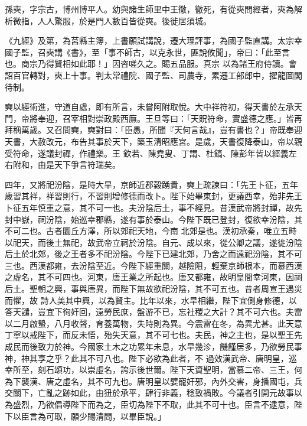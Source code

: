 \begin{pinyinscope}
 孫奭，字宗古，博州博平人。幼與諸生師里中王徹，徹死，有從奭問經者，奭為解析微指，人人驚服，於是門人數百皆從奭。後徙居須城。



 《九經》及第，為莒縣主簿，上書願試講說，遷大理評事，為國子監直講。太宗幸國子監，召奭講《書》，至「事不師古，以克永世，匪說攸聞」，帝曰：「此至言也。商宗乃得賢相如此耶！」因咨嗟久之。賜五品服。真宗
 以為諸王府侍讀。會詔百官轉對，奭上十事。判太常禮院、國子監、司農寺，累遷工部郎中，擢龍圖閣待制。



 奭以經術進，守道自處，即有所言，未嘗阿附取悅。大中祥符初，得天書於左承天門，帝將奉迎，召宰相對崇政殿西廡。王旦等曰：「天貺符命，實盛德之應。」皆再拜稱萬歲。又召問奭，奭對曰：「臣愚，所聞『天何言哉』，豈有書也？」帝既奉迎天書，大赦改元，布告其事於天下，築玉清昭應宮。是歲，天書復降泰山，帝以親受符命，遂議封禪，作禮樂。王
 欽若、陳堯叟、丁謂、杜鎬、陳彭年皆以經義左右附和，由是天下爭言符瑞矣。



 四年，又將祀汾陰，是時大旱，京師近郡穀踴貴，奭上疏諫曰：「先王卜征，五年歲習其祥，祥習則行，不習則增修德而改卜。陛下始畢東封，更議西幸，殆非先王卜征五年慎重之意，其不可一也。夫汾陰后土，事不經見。昔漢武帝將封禪，故先封中嶽，祠汾陰，始巡幸郡縣，遂有事於泰山。今陛下既已登封，復欲幸汾陰，其不可二也。古者圜丘方澤，所以郊祀天地，今南
 北郊是也。漢初承秦，唯立五畤以祀天，而後土無祀，故武帝立祠於汾陰。自元、成以來，從公卿之議，遂徙汾陰后土於北郊，後之王者多不祀汾陰。今陛下已建北郊，乃舍之而遠祀汾陰，其不可三也。西漢都雍，去汾陰至近。今陛下經重關，越險阻，輕棄京師根本，而慕西漢之虛名，其不可四也。河東，唐王業之所起也。唐又都雍，故明皇間幸河東，因祠后土。聖朝之興，事與唐異，而陛下無故欲祀汾陰，其不可五也。昔者周宣王遇災而懼，故
 詩人美其中興，以為賢主。比年以來，水旱相繼，陛下宜側身修德，以答天譴，豈宜下徇奸回，遠勞民庶，盤游不已，忘社稷之大計？其不可六也。夫雷以二月啟蟄，八月收聲，育養萬物，失時則為異。今震雷在冬，為異尤甚。此天意丁寧以戒陛下，而反未悟，殆失天意，其不可七也。夫民，神之主也，是以聖王先成民而後致力於神。今國家土木之功累年未息，水旱幾沴，饑饉居多，乃欲勞民事神，神其享之乎？此其不可八也。陛下必欲為此者，不
 過效漢武帝、唐明皇，巡幸所至，刻石頌功，以崇虛名，誇示後世爾。陛下天資聖明，當慕二帝、三王，何為下襲漢、唐之虛名，其不可九也。唐明皇以嬖寵奸邪，內外交害，身播國屯，兵交關下，亡亂之跡如此，由狃於承平，肆行非義，稔致禍敗。今議者引開元故事以為盛烈，乃欲倡導陛下而為之，臣切為陛下不取，此其不可十也。臣言不逮意，陛下以臣言為可取，願少賜清問，以畢臣說。」




\end{pinyinscope}
